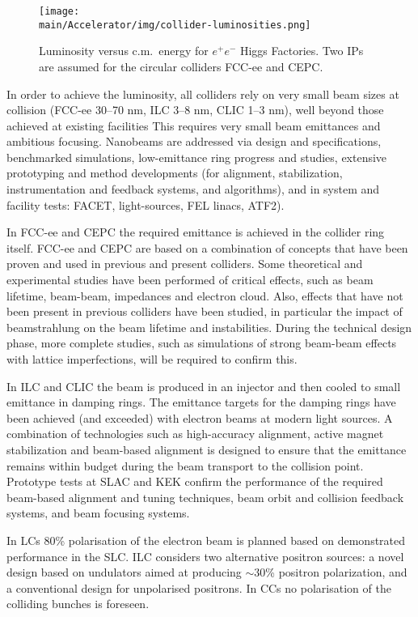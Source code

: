 \begin{figure}[ht]
\centering
\texttt{[image: \\main/Accelerator/img/collider-luminosities.png]}
\caption{Luminosity versus c.m.~energy for $e^+e^-$ Higgs Factories.
Two IPs are assumed for the circular colliders FCC-ee and CEPC.}
\label{luminosities}
\end{figure}


In order to achieve the luminosity, all colliders rely on very small beam sizes at collision (FCC-ee 30--70 nm, ILC 3--8 nm, CLIC 1--3 nm), well beyond those achieved at existing facilities  This requires very small beam emittances and ambitious focusing. Nanobeams are addressed via design and specifications, benchmarked simulations, low-emittance ring progress and studies, extensive prototyping and method developments (for alignment, stabilization, instrumentation and feedback systems, and algorithms), and in system and facility tests: FACET, light-sources, FEL linacs, ATF2).

In FCC-ee and CEPC the required emittance is achieved in the collider ring itself. FCC-ee and CEPC are based on a combination of concepts that have been proven and used in previous and present colliders. Some theoretical and experimental studies have been performed of critical effects, such as beam lifetime, beam-beam, impedances and electron cloud. Also, effects that have not been present in previous colliders have been studied, in particular the impact of beamstrahlung on the beam lifetime and instabilities. During the technical design phase, more complete studies, such as simulations of strong beam-beam effects with lattice imperfections, 
will be required to confirm this.

In ILC and CLIC the beam is produced in an injector and then cooled to small emittance in damping rings. The emittance targets for the damping rings have been achieved (and exceeded) with electron beams at modern light sources. A combination of technologies such as high-accuracy alignment, active magnet stabilization and beam-based alignment is designed to ensure that the emittance remains within budget during the beam transport to the collision point. Prototype tests at SLAC and KEK confirm the performance of the required beam-based alignment and tuning techniques, beam orbit and collision feedback systems, and beam focusing systems. 

In LCs 80\% polarisation of the electron beam is planned based on demonstrated performance in the SLC. ILC considers two alternative positron sources: a novel design based on undulators aimed at producing $\sim$30\% positron polarization, and a conventional design for unpolarised positrons. In CCs no polarisation of the colliding bunches is foreseen. 

